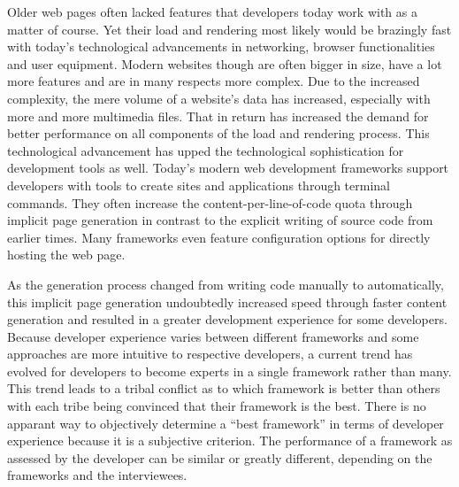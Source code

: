 \documentclass[a4paper, 12pt]{article}
\begin{document}
Older web pages often lacked features that developers today work with as a matter of course.
Yet their load and rendering most likely would be brazingly fast with today's technological advancements in networking, browser functionalities and user equipment.
Modern websites though are often bigger in size, have a lot more features and are in many respects more complex.
Due to the increased complexity, the mere volume of a website's data has increased, especially with more and more multimedia files.
That in return has increased the demand for better performance on all components of the load and rendering process.
This technological advancement has upped the technological sophistication for development tools as well.
Today's modern web development frameworks support developers with tools to create sites and applications through terminal commands.
They often increase the content-per-line-of-code quota through implicit page generation in contrast to the explicit writing of source code from earlier times.
Many frameworks even feature configuration options for directly hosting the web page.

As the generation process changed from writing code manually to automatically, this implicit page generation undoubtedly increased speed through faster content generation and resulted in a greater development experience for some developers.
Because developer experience varies between different frameworks and some approaches are more intuitive to respective developers, a current trend has evolved for developers to become experts in a single framework rather than many.
This trend leads to a tribal conflict as to which framework is better than others with each tribe being convinced that their framework is the best.
There is no apparant way to objectively determine a \enquote{best framework} in terms of developer experience because it is a subjective criterion.
The performance of a framework as assessed by the developer can be similar or greatly different, depending on the frameworks and the interviewees.
\end{document}
